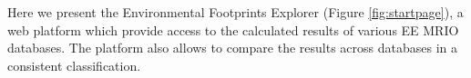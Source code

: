 Here we present the Environmental Footprints Explorer (Figure \ref{fig:startpage}), a web platform which provide access to the calculated results of
various EE MRIO databases. The platform also allows to compare the results across databases in a consistent classification. 